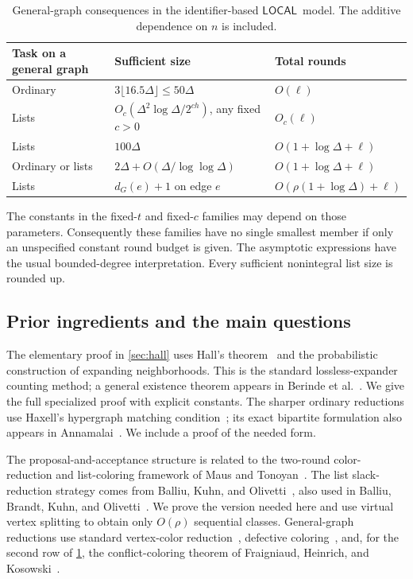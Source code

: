 \documentclass[11pt]{article}
\theoremstyle{definition}
\theoremstyle{remark}
\newcommand{\LOCAL}{\ensuremath{\mathsf{LOCAL}}}
\begin{document}
\begin{table}[htbp]
\centering\small
\begin{tabularx}{\linewidth}{@{}lXl@{}}
\toprule
Task on a general graph & Sufficient size & Total rounds\\
\midrule
Ordinary & $3\lfloor16.5\Delta\rfloor\le50\Delta$ & $O(\ell)$\\
Lists & $O_c(\Delta^2\log\Delta/2^{c h})$, any fixed $c>0$ & $O_c(\ell)$\\
Lists & $100\Delta$ & $O(1+\log\Delta+\ell)$\\
Ordinary or lists & $2\Delta+O(\Delta/\log\log\Delta)$ & $O(1+\log\Delta+\ell)$\\
Lists & $d_G(e)+1$ on edge $e$ & $O(\rho(1+\log\Delta)+\ell)$\\
\bottomrule
\end{tabularx}
\caption{General-graph consequences in the identifier-based \LOCAL\ model.
The additive dependence on $n$ is included.}
\label{tab:general}
\end{table}

The constants in the fixed-$t$ and fixed-$c$ families may depend on those
parameters. Consequently these families have no single smallest member
if only an unspecified constant round budget is given. The asymptotic
expressions have the usual bounded-degree interpretation. Every sufficient
nonintegral list size is rounded up.

\FloatBarrier
\subsection{Prior ingredients and the main questions}
The elementary proof in \cref{sec:hall} uses Hall's theorem~\cite{Hall} and
the probabilistic construction of expanding neighborhoods. This is the
standard lossless-expander counting method; a general existence theorem
appears in Berinde et al.~\cite[Proposition 6]{BGIKS}. We give the full
specialized proof with explicit constants. The sharper ordinary reductions
use Haxell's hypergraph matching condition~\cite{Haxell}; its exact
bipartite formulation also appears in Annamalai~\cite[Theorem 1.1]{Annamalai}.
We include a proof of the needed form.

The proposal-and-acceptance structure is related to the two-round
color-reduction and list-coloring framework of Maus and
Tonoyan~\cite{MT}. The list slack-reduction strategy comes from
Balliu, Kuhn, and Olivetti~\cite[Lemma 4.2]{BKO}, also used in
Balliu, Brandt, Kuhn, and Olivetti~\cite[Appendix D]{BBKO}. We prove the
version needed here and use virtual vertex splitting to obtain only
$O(\rho)$ sequential classes. General-graph reductions use standard
vertex-color reduction~\cite{Linial}, defective coloring~\cite{Kuhn,BEK},
and, for the second row of \cref{tab:general}, the conflict-coloring
theorem of Fraigniaud, Heinrich, and Kosowski~\cite{FHK}.
\end{document}
